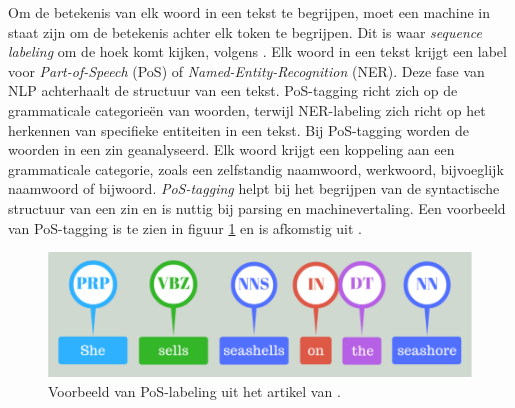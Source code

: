 Om de betekenis van elk woord in een tekst te begrijpen, moet een machine in staat zijn om de betekenis achter elk token te begrijpen. Dit is waar \textit{sequence labeling} om de hoek komt kijken, volgens \textcite{Eisenstein2019}. Elk woord in een tekst krijgt een label voor \textit{Part-of-Speech} (PoS) of \textit{Named-Entity-Recognition} (NER). Deze fase van NLP achterhaalt de structuur van een tekst. PoS-tagging richt zich op de grammaticale categorieën van woorden, terwijl NER-labeling zich richt op het herkennen van specifieke entiteiten in een tekst. Bij PoS-tagging worden de woorden in een zin geanalyseerd. Elk woord krijgt een koppeling aan een grammaticale categorie, zoals een zelfstandig naamwoord, werkwoord, bijvoeglijk naamwoord of bijwoord. \textit{PoS-tagging} helpt bij het begrijpen van de syntactische structuur van een zin en is nuttig bij parsing en machinevertaling. Een voorbeeld van PoS-tagging is te zien in figuur \ref{fig:pos-labeling} en is afkomstig uit \textcite{Bilisci2021}.

\begin{center}
	\begin{figure}[H]
		\includegraphics[width=15cm]{img/poslabeling.png}
		\caption{Voorbeeld van PoS-labeling uit het artikel van \textcite{Bilisci2021}.}
		\label{fig:pos-labeling}
	\end{figure}
\end{center}

\medspace

